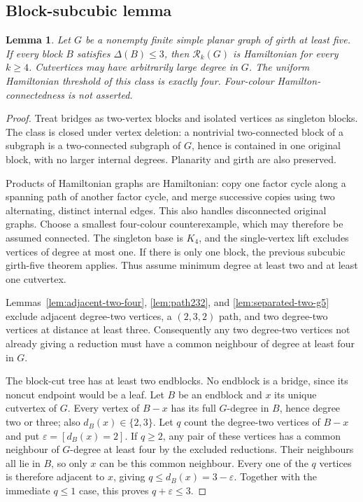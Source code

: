 \documentclass[11pt]{article}
\newtheorem{lemma}[theorem]{Lemma}
\theoremstyle{remark}
\newcommand{\Rk}{\mathcal R_k}
\numberwithin{equation}{section}
\numberwithin{table}{section}
\begin{document}
\subsection{Block-subcubic lemma}
\begin{lemma}\label{lem:block-subcubic}
Let $G$ be a nonempty finite simple planar graph of girth at least
five. If every block $B$ satisfies $\Delta(B)\le3$, then $\Rk(G)$ is
Hamiltonian for every $k\ge4$. Cutvertices may have arbitrarily large
degree in $G$. The uniform Hamiltonian threshold of this class is exactly four.
Four-colour Hamilton-connectedness is not asserted.
\end{lemma}
\begin{proof}
Treat bridges as two-vertex blocks and isolated vertices as singleton
blocks. The class is closed under vertex deletion: a nontrivial
two-connected block of a subgraph is a two-connected subgraph of
$G$, hence is contained in one original block, with no larger
internal degrees. Planarity and girth are also preserved.

Products of Hamiltonian graphs are Hamiltonian: copy one factor
cycle along a spanning path of another factor cycle, and merge
successive copies using two alternating, distinct internal edges.
This also handles disconnected original graphs. Choose a smallest
four-colour counterexample, which may therefore be assumed connected.
The singleton base is $K_4$, and the single-vertex lift excludes
vertices of degree at most one. If there is only one block, the
previous subcubic girth-five theorem applies. Thus assume minimum
degree at least two and at least one cutvertex.

Lemmas~\ref{lem:adjacent-two-four}, \ref{lem:path232}, and
\ref{lem:separated-two-g5} exclude adjacent degree-two vertices, a
$(2,3,2)$ path, and two degree-two vertices at distance at least three.
Consequently any two degree-two vertices not already giving a
reduction must have a common neighbour of degree at least four in $G$.

The block-cut tree has at least two endblocks. No endblock is a
bridge, since its noncut endpoint would be a leaf. Let $B$ be an
endblock and $x$ its unique cutvertex of $G$. Every vertex of
$B-x$ has its full $G$-degree in $B$, hence degree two or three;
also $d_B(x)\in\{2,3\}$. Let $q$ count the degree-two vertices of $B-x$ and put
$\varepsilon=[d_B(x)=2]$. If $q\ge2$, any pair of these vertices
has a common neighbour of $G$-degree at least four by the excluded
reductions. Their neighbours all lie in $B$, so only $x$ can be
this common neighbour. Every one of the $q$ vertices is therefore
adjacent to $x$, giving $q\le d_B(x)=3-\varepsilon$. Together with
the immediate $q\le1$ case, this proves $q+\varepsilon\le3$.


\end{proof}
\end{document}
